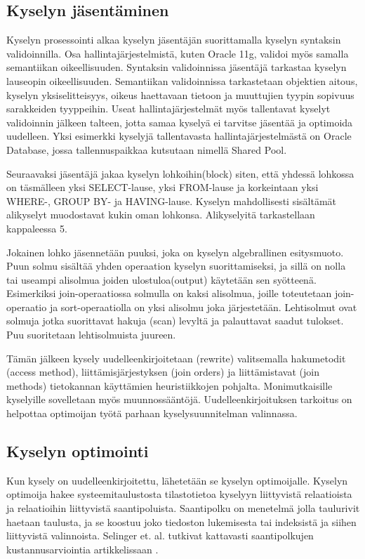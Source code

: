 \documentclass[finnish]{tktltiki2}
\theoremstyle{definition}
\theoremstyle{remark}
\begin{document}
\subsection{Kyselyn jäsentäminen}
Kyselyn prosessointi alkaa kyselyn jäsentäjän suorittamalla kyselyn syntaksin validoinnilla. \cite{selinger1979access} Osa hallintajärjestelmistä, kuten Oracle 11g, validoi myös samalla semantiikan oikeellisuuden. \cite{oracle2009doc}
Syntaksin validoinnissa jäsentäjä tarkastaa kyselyn lauseopin oikeellisuuden. Semantiikan validoinnissa tarkastetaan objektien aitous, kyselyn yksiselitteisyys, oikeus haettavaan tietoon ja muuttujien tyypin sopivuus sarakkeiden tyyppeihin. Useat hallintajärjestelmät myös
tallentavat kyselyt validoinnin jälkeen talteen, jotta samaa kyselyä ei tarvitse jäsentää ja optimoida uudelleen. Yksi esimerkki kyselyjä tallentavasta hallintajärjestelmästä on Oracle Database, jossa tallennuspaikkaa kutsutaan nimellä Shared Pool. \cite{oracle2005doc}

Seuraavaksi jäsentäjä jakaa kyselyn lohkoihin(block) siten, että yhdessä lohkossa on täsmälleen yksi SELECT-lause, yksi FROM-lause ja korkeintaan yksi WHERE-, GROUP BY- ja HAVING-lause. \cite{ramakrishnan2003database}
Kyselyn mahdollisesti sisältämät alikyselyt muodostavat kukin oman lohkonsa. Alikyselyitä tarkastellaan kappaleessa 5.

Jokainen lohko jäsennetään puuksi, joka on kyselyn algebrallinen esitysmuoto. \cite{mahajan2012}
Puun solmu sisältää yhden operaation kyselyn suorittamiseksi, ja sillä on nolla tai useampi alisolmua joiden ulostuloa(output) käytetään sen syötteenä.
Esimerkiksi join-operaatiossa solmulla on kaksi alisolmua, joille toteutetaan join-operaatio ja sort-operaatiolla on yksi alisolmu joka järjestetään.
Lehtisolmut ovat solmuja jotka suorittavat hakuja (scan) levyltä ja palauttavat saadut tulokset. 
Puu suoritetaan lehtisolmuista juureen.

Tämän jälkeen kysely uudelleenkirjoitetaan (rewrite)\cite{ioannidis1996query} valitsemalla hakumetodit (access method), liittämisjärjestyksen (join orders) ja liittämistavat (join methods) tietokannan käyttämien heuristiikkojen pohjalta. Monimutkaisille kyselyille sovelletaan myös muunnossääntöjä. \cite{mahajan2012}
Uudelleenkirjoituksen tarkoitus on helpottaa optimoijan työtä parhaan kyselysuunnitelman valinnassa.

\subsection{Kyselyn optimointi}
Kun kysely on uudelleenkirjoitettu, lähetetään se kyselyn optimoijalle. Kyselyn optimoija hakee systeemitaulustosta tilastotietoa kyselyyn liittyvistä relaatioista ja relaatioihin liittyvistä saantipoluista. Saantipolku on menetelmä jolla taulurivit haetaan taulusta, ja se koostuu joko tiedoston lukemisesta tai indeksistä ja siihen liittyvistä valinnoista. Selinger et. al. tutkivat kattavasti saantipolkujen kustannusarviointia artikkelissaan \cite{selinger1979access}. 
\end{document}
